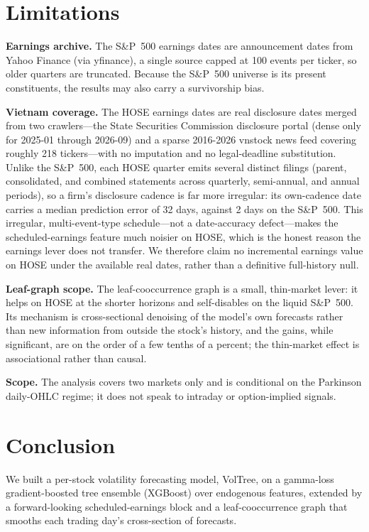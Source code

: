 \documentclass[runningheads]{llncs}
\begin{document}
\section{Limitations}
\noindent\textbf{Earnings archive.} The S\&P~500 earnings dates are announcement dates from Yahoo Finance
(via yfinance), a single source capped at 100 events per ticker, so older quarters are truncated. Because
the S\&P~500 universe is its present constituents, the results may also carry a survivorship bias.

\noindent\textbf{Vietnam coverage.} The HOSE earnings dates are real disclosure dates merged from two
crawlers---the State Securities Commission disclosure portal (dense only for 2025-01 through 2026-09) and
a sparse 2016-2026 vnstock news feed covering roughly 218 tickers---with no imputation and no
legal-deadline substitution. Unlike the S\&P~500, each HOSE quarter emits several distinct filings
(parent, consolidated, and combined statements across quarterly, semi-annual, and annual periods), so a
firm's disclosure cadence is far more irregular: its own-cadence date carries a median prediction error of
32 days, against 2 days on the S\&P~500. This irregular, multi-event-type schedule---not a date-accuracy
defect---makes the scheduled-earnings feature much noisier on HOSE, which is the honest reason the earnings
lever does not transfer. We therefore claim no incremental earnings value on HOSE under the available real
dates, rather than a definitive full-history null.

\noindent\textbf{Leaf-graph scope.} The leaf-cooccurrence graph is a small, thin-market lever: it helps
on HOSE at the shorter horizons and self-disables on the liquid S\&P~500. Its mechanism is
cross-sectional denoising of the model's own forecasts rather than new information from outside the
stock's history, and the gains, while significant, are on the order of a few tenths of a percent; the
thin-market effect is associational rather than causal.

\noindent\textbf{Scope.} The analysis covers two markets only and is conditional on the Parkinson
daily-OHLC regime; it does not speak to intraday or option-implied signals.

\section{Conclusion}
We built a per-stock volatility forecasting model, VolTree, on a gamma-loss gradient-boosted tree
ensemble (XGBoost) over endogenous features, extended by a forward-looking scheduled-earnings block and a
leaf-cooccurrence graph that smooths each trading day's cross-section of forecasts.
\end{document}
